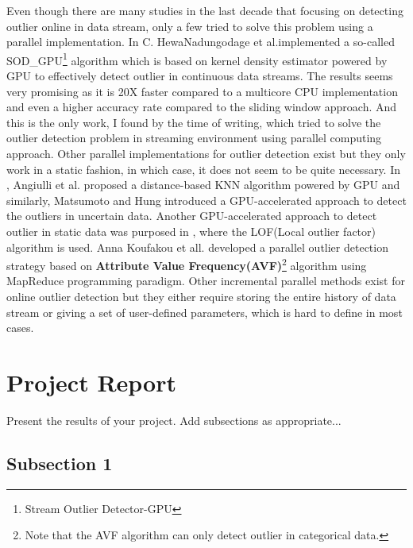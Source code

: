 \documentclass[11pt]{article}       %
\begin{document}
Even though there are many studies in the last decade that focusing on detecting outlier online in data stream, only a few tried to solve this problem using a parallel implementation. In \cite{7516110} C. HewaNadungodage et al.implemented a so-called SOD\_GPU\footnote{Stream Outlier Detector-GPU} algorithm which is based on kernel density estimator powered by GPU to effectively detect outlier in continuous data streams. The results seems very promising as it is 20X faster compared to a multicore CPU implementation and even a higher accuracy rate compared to the sliding window approach. And this is the only work, I found by the time of writing, which tried to solve the outlier detection problem in streaming environment using parallel computing approach. Other parallel implementations for outlier detection exist but they only work in a static fashion, in which case, it does not seem to be quite necessary. In \cite{6641405},  Angiulli et al. proposed a distance-based KNN algorithm powered by GPU and similarly, Matsumoto and Hung\cite{Matsumoto2012} introduced a GPU-accelerated approach to detect the outliers in uncertain data. Another GPU-accelerated approach to detect outlier in static data was purposed in \cite{Alshawabkeh:2010:ALO:1735688.1735707}, where the LOF(Local outlier factor) algorithm is used. Anna Koufakou et all.\cite{4634266} developed a parallel outlier detection strategy based on \textbf{Attribute Value Frequency(AVF)}\cite{4410382}\footnote{Note that the AVF algorithm can only detect outlier in categorical data.} algorithm using MapReduce programming paradigm. Other incremental parallel methods exist for online outlier detection but they either require storing the entire history of data stream or giving a set of user-defined parameters, which is hard to define in most cases. 


\section{Project Report} \label{projrep}

Present the results of your project. Add subsections as appropriate...

\subsection{Subsection 1} \label{subsect1}
\end{document}
